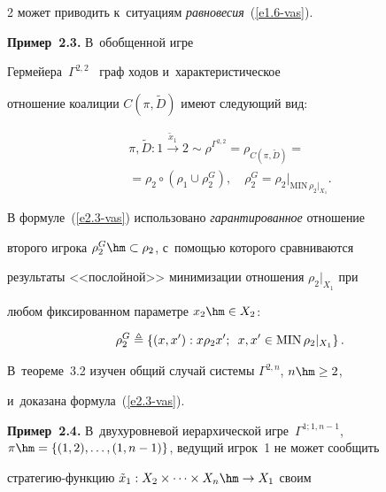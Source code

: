 \begin{multicols}{2}
может приводить к~ситуациям \textit{равновесия}~(\ref{e1.6-vas}). 

    

    \textbf{Пример~2.3.} В~обоб\-щен\-ной игре  

Гермейера~$\Gamma^{2,2}$~\cite{1-vas} граф ходов и~характеристическое 

отношение коалиции $C(\pi, \tilde{D})$ име\-ют сле\-ду\-ющий вид:

    \begin{multline}

    \pi, \tilde{D}: \boxed{1} \overset{\tilde{x}_1}{\to} 

\boxed{2}\sim\rho^{\Gamma^{2,2}} = \rho_{C(\pi,\tilde{D})} ={}\\

    {}= \rho_2\circ \left( \rho_1\cup \rho_2^G\right), \quad \rho_2^G 

=\rho_2\vert_{\mathrm{MIN}\,\rho_2\vert_{X_1}}.

\label{e2.3-vas}

\end{multline}



    В формуле~(\ref{e2.3-vas}) использовано \textit{гарантированное} отношение 

второго игрока $\rho_2^G\hm\subset \rho_2$, с~по\-мощью которого срав\-ни\-ва\-ют\-ся 

результаты <<по\-слой\-ной>> минимизации отношения $\rho_2\vert_{X_1}$ при 

любом фиксированном па\-ра\-мет\-ре $x_2\hm\in X_2$:

    \begin{equation}

    \rho_2^G \triangleq \left\{ (x,x^\prime): x\rho_2 x^\prime;\enskip  x, x^\prime\in \mathrm{MIN}\,\rho_2\vert_{X_1}\right\}.

    \label{e2.4-vas}

    \end{equation}

В~тео\-ре\-ме~3.2 \mbox{изучен} общий случай сис\-те\-мы $\Gamma^{2,n}$, $n\hm\geq 2$,  

и~доказана формула~(\ref{e2.3-vas}). 



    \textbf{Пример~2.4.} В~двухуровневой иерархической игре~$\Gamma^{1;1,n-

1}$, $\pi \hm= \{ (1,2), \ldots , (1, n-1)\}$, ведущий игрок~1 не может сообщить  

стра\-те\-гию-функ\-цию  $\tilde{x}_1: X_2\times \cdots \times X_n\hm\to X_1$ своим 


\end{multicols}
